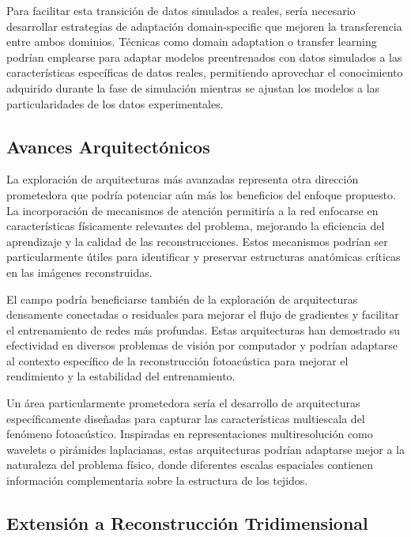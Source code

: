 Para facilitar esta transición de datos simulados a reales, sería necesario desarrollar estrategias de adaptación domain-specific que mejoren la transferencia entre ambos dominios. Técnicas como domain adaptation o transfer learning podrían emplearse para adaptar modelos preentrenados con datos simulados a las características específicas de datos reales, permitiendo aprovechar el conocimiento adquirido durante la fase de simulación mientras se ajustan los modelos a las particularidades de los datos experimentales.

\subsection{Avances Arquitectónicos}

La exploración de arquitecturas más avanzadas representa otra dirección prometedora que podría potenciar aún más los beneficios del enfoque propuesto. La incorporación de mecanismos de atención \cite{oktay2018attention,schlemper2019attention} permitiría a la red enfocarse en características físicamente relevantes del problema, mejorando la eficiencia del aprendizaje y la calidad de las reconstrucciones. Estos mecanismos podrían ser particularmente útiles para identificar y preservar estructuras anatómicas críticas en las imágenes reconstruidas.

El campo podría beneficiarse también de la exploración de arquitecturas densamente conectadas \cite{huang2017densely} o residuales para mejorar el flujo de gradientes y facilitar el entrenamiento de redes más profundas. Estas arquitecturas han demostrado su efectividad en diversos problemas de visión por computador y podrían adaptarse al contexto específico de la reconstrucción fotoacústica para mejorar el rendimiento y la estabilidad del entrenamiento.

Un área particularmente prometedora sería el desarrollo de arquitecturas específicamente diseñadas para capturar las características multiescala del fenómeno fotoacústico. Inspiradas en representaciones multiresolución como wavelets o pirámides laplacianas, estas arquitecturas podrían adaptarse mejor a la naturaleza del problema físico, donde diferentes escalas espaciales contienen información complementaria sobre la estructura de los tejidos.

\subsection{Extensión a Reconstrucción Tridimensional}

